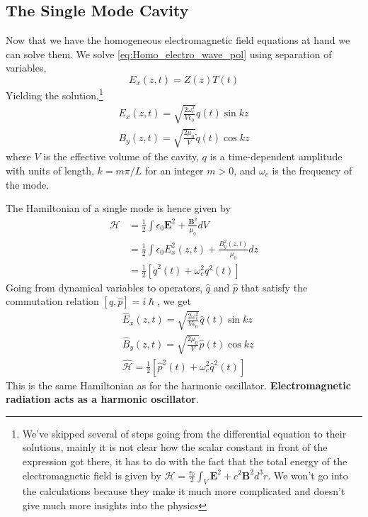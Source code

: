 \subsection{The Single Mode Cavity}
Now that we have the homogeneous electromagnetic field equations at hand we can solve them.
We solve \ref{eq:Homo_electro_wave_pol} using separation of variables,
\[
    E_x (z, t)= Z (z)T (t)
\]
Yielding the solution,\footnote{We've skipped several of steps going from the differential equation to their solutions, mainly it is not clear how the scalar constant in front of the expression got there, it has to do with the fact that the total energy of the electromagnetic field is given by $\mathcal{H} = \frac{\epsilon_0}{2} \int_V \mathbf{E}^2 + c^2 \mathbf{B}^2 d^3 r$. We won't go into the calculations because they make it much more complicated and doesn't give much more insights into the physics}
\begin{equation}
    \begin{split}
        E_x (z, t) = \sqrt{\frac{2 \omega_c^2}{V \epsilon_0}}q (t)\sin{kz} \\
        B_y (z, t) = \sqrt{\frac{2 \mu_0}{V}}\dot{q} (t)\cos{kz}
    \end{split}
\end{equation}
where $V$ is the effective volume of the cavity, $q$ is a time-dependent amplitude with units of length, $k = m\pi/L$ for
an integer $m > 0$, and $\omega_c$ is the frequency of the mode.

The Hamiltonian of a single mode is hence given by
\begin{align}
    \mathcal{H} &= \frac{1}{2}\int\epsilon_0 \mathbf{E}^2 + \frac{\mathbf{B}^2}{\mu_0} dV \\
    &= \frac{1}{2}\int\epsilon_0 E_x^2 (z, t) + \frac{B_y^2 (z, t)}{\mu_0} dz \\
    &= \frac{1}{2}[\dot{q}^2 (t) + \omega_c^2 q^2 (t)]
\end{align}
Going from dynamical variables to operators, $\hat{q}$ and $\hat{p}$ that satisfy the commutation relation $[\hat{q}, \hat{p}] = i\hslash$, we get
\begin{align}
     &\hat{E}_x (z, t) = \sqrt{\frac{2 \omega_c^2}{V \epsilon_0}}\hat{q} (t)\sin{kz} \\
     &\hat{B}_y (z, t) = \sqrt{\frac{2 \mu_0}{V}}\hat{p} (t)\cos{kz} \\
     &\hat{\mathcal{H}} = \frac{1}{2}[\hat{p}^2 (t) + \omega_c^2 \hat{q}^2 (t)]
\end{align}
This is the same Hamiltonian as for the harmonic oscillator. \textbf{Electromagnetic radiation acts as a harmonic oscillator}.

